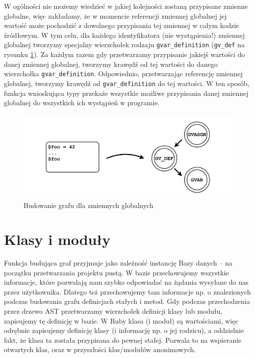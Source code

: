 \documentclass[declaration,shortabstract,mgr]{iithesis}
\begin{document}
W ogólności nie możemy wiedzieć w jakiej kolejności zostaną przypisane zmienne globalne, więc zakładamy, że w momencie referencji zmiennej globalnej jej wartość może pochodzić z dowolnego przypisania tej zmiennej w całym kodzie źródłowym. W tym celu, dla każdego identyfikatora (nie wystąpienia!) zmiennej globalnej tworzymy specjalny wierzchołek rodzaju \texttt{gvar\_definition} (\texttt{gv\_def} na rysunku \ref{fig:graph-gvars}). Za każdym razem gdy przetwarzamy przypisanie jakiejś wartości do danej zmiennej globalnej, tworzymy krawędź od tej wartości do danego wierzchołka \texttt{gvar\_definition}. Odpowiednio, przetwarzając referencję zmiennej globalnej, tworzymy krawędź od \texttt{gvar\_definition} do tej wartości. W ten sposób, funkcja wnioskująca typy przekaże wszystkie możliwe przypisania danej zmiennej globalnej do wszystkich ich wystąpień w programie.

\begin{figure}[htb]
	\centering
	\includegraphics[scale=0.4]{imgs/msc-gvars.png}
	\caption{Budowanie grafu dla zmiennych globalnych}
	\label{fig:graph-gvars}
\end{figure}

\section{Klasy i moduły}

Funkcja budująca graf przyjmuje jako zależność instancję Bazy danych -- na początku przetwarzania projektu pustą. W bazie przechowujemy wszystkie informacje, które pozwalają nam szybko odpowiadać na żądania wysyłane do nas przez użytkownika. Dlatego też przechowujemy tam informacje np. o znalezionych podczas budowania grafu definicjach stałych i metod.
Gdy podczas przechodzenia przez drzewo AST przetwarzamy wierzchołek definicji klasy lub modułu, zapisujemy tę definicję w bazie. W Ruby klasa (i moduł) są wartościami, więc odrębnie zapisujemy definicję klasy (i informację np. o jej rodzicu), a oddzielnie fakt, że klasa ta została przypisana do pewnej stałej. Pozwala to na wspieranie otwartych klas, oraz w przyszłości klas/modułów anonimowych.
\end{document}
